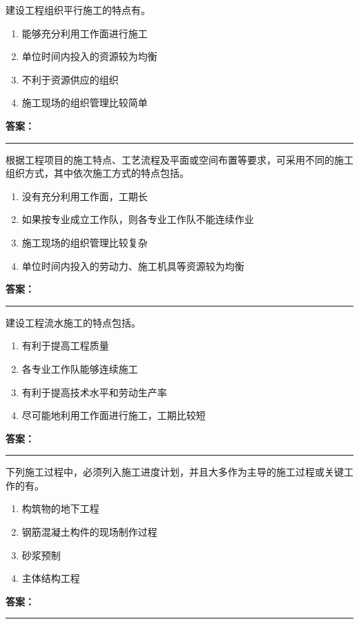 \documentclass[UTF8,fontset=fandol,11pt]{ctexart}
\newcommand{\answerline}{\textcolor{answerred}{\rule{2.4cm}{0.7pt}}}
\begin{document}
\begin{quizbox}[title={第 15 题}]
建设工程组织平行施工的特点有。\\
\begin{enumerate}[label=\Alph*.]
\item 能够充分利用工作面进行施工
\item 单位时间内投入的资源较为均衡
\item 不利于资源供应的组织
\item 施工现场的组织管理比较简单
\end{enumerate}
\textbf{\textcolor{answerred}{答案：}} \answerline
\end{quizbox}

\begin{quizbox}[title={第 16 题}]
根据工程项目的施工特点、工艺流程及平面或空间布置等要求，可采用不同的施工组织方式，其中依次施工方式的特点包括。\\
\begin{enumerate}[label=\Alph*.]
\item 没有充分利用工作面，工期长
\item 如果按专业成立工作队，则各专业工作队不能连续作业
\item 施工现场的组织管理比较复杂
\item 单位时间内投入的劳动力、施工机具等资源较为均衡
\end{enumerate}
\textbf{\textcolor{answerred}{答案：}} \answerline
\end{quizbox}

\begin{quizbox}[title={第 17 题}]
建设工程流水施工的特点包括。\\
\begin{enumerate}[label=\Alph*.]
\item 有利于提高工程质量
\item 各专业工作队能够连续施工
\item 有利于提高技术水平和劳动生产率
\item 尽可能地利用工作面进行施工，工期比较短
\end{enumerate}
\textbf{\textcolor{answerred}{答案：}} \answerline
\end{quizbox}

\begin{quizbox}[title={第 18 题}]
下列施工过程中，必须列入施工进度计划，并且大多作为主导的施工过程或关键工作的有。\\
\begin{enumerate}[label=\Alph*.]
\item 构筑物的地下工程
\item 钢筋混凝土构件的现场制作过程
\item 砂浆预制
\item 主体结构工程
\end{enumerate}
\textbf{\textcolor{answerred}{答案：}} \answerline
\end{quizbox}
\end{document}
